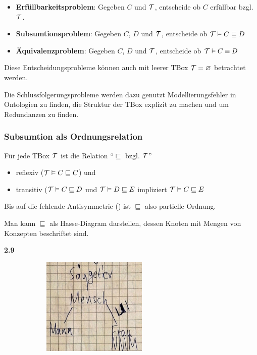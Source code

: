 \begin{itemize}
  \item \textbf{Erfüllbarkeitsproblem}: Gegeben $C$ und $\mathcal{T}$, entscheide ob $C$ erfüllbar bzgl. $\mathcal{T}$.
  \item \textbf{Subsumtionsproblem}: Gegeben $C$, $D$ und $\mathcal{T}$, entscheide ob $\mathcal{T} \vDash C \sqsubseteq D$
  \item \textbf{Äquivalenzproblem}: Gegeben $C$, $D$ und $\mathcal{T}$, entscheide ob $\mathcal{T} \vDash C \equiv D$
\end{itemize}

Diese Entscheidungsprobleme können auch mit leerer TBox $\mathcal{T} = \varnothing$ betrachtet werden.

Die Schlussfolgerungsprobleme werden dazu genutzt Modellierungsfehler in Ontologien zu finden, die Struktur der TBox explizit zu machen und um Redundanzen zu finden.

\subsubsection{Subsumtion als Ordnungsrelation}\label{subordn}

\begin{lemma} 
Für jede TBox $\mathcal{T}$ ist die Relation ``$\sqsubseteq$ bzgl. $\mathcal{T}$''

\begin{itemize}
  \item reflexiv ($\mathcal{T} \vDash C \sqsubseteq C$) und
  \item transitiv ($\mathcal{T} \vDash C \sqsubseteq D$ und $\mathcal{T} \vDash D \sqsubseteq E$ impliziert $\mathcal{T} \vDash C \sqsubseteq E$
\end{itemize}
\end{lemma}

Bis auf die fehlende Antisymmetrie () ist $\sqsubseteq$ also partielle Ordnung.

Man kann $\sqsubseteq$ als Hasse-Diagram darstellen, dessen Knoten mit Mengen von Konzepten beschriftet sind.

\textbf{2.9}

\includegraphics[width=3.71910in,height=1.83200in]{media/haase.png}


